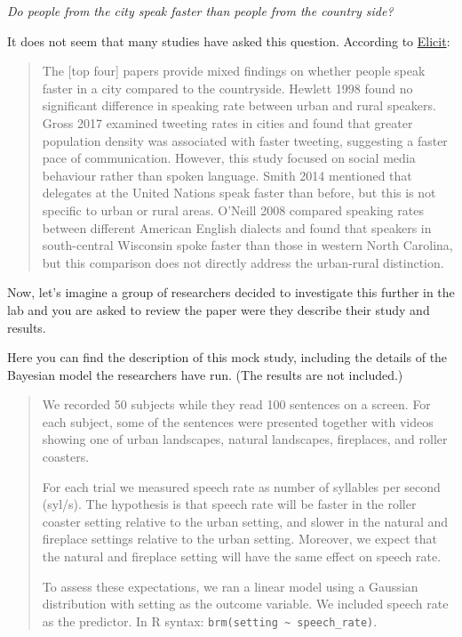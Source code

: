 \documentclass[
]{article}
\begin{document}
\emph{Do people from the city speak faster than people from the country
side?}

It does not seem that many studies have asked this question. According
to \href{elicit.com}{Elicit}:

\begin{quote}
The {[}top four{]} papers provide mixed findings on whether people speak
faster in a city compared to the countryside. Hewlett 1998 found no
significant difference in speaking rate between urban and rural
speakers. Gross 2017 examined tweeting rates in cities and found that
greater population density was associated with faster tweeting,
suggesting a faster pace of communication. However, this study focused
on social media behaviour rather than spoken language. Smith 2014
mentioned that delegates at the United Nations speak faster than before,
but this is not specific to urban or rural areas. O'Neill 2008 compared
speaking rates between different American English dialects and found
that speakers in south-central Wisconsin spoke faster than those in
western North Carolina, but this comparison does not directly address
the urban-rural distinction.
\end{quote}

Now, let's imagine a group of researchers decided to investigate this
further in the lab and you are asked to review the paper were they
describe their study and results.

Here you can find the description of this mock study, including the
details of the Bayesian model the researchers have run. (The results are
not included.)

\begin{quote}
We recorded 50 subjects while they read 100 sentences on a screen. For
each subject, some of the sentences were presented together with videos
showing one of urban landscapes, natural landscapes, fireplaces, and
roller coasters.

For each trial we measured speech rate as number of syllables per second
(syl/s). The hypothesis is that speech rate will be faster in the roller
coaster setting relative to the urban setting, and slower in the natural
and fireplace settings relative to the urban setting. Moreover, we
expect that the natural and fireplace setting will have the same effect
on speech rate.

To assess these expectations, we ran a linear model using a Gaussian
distribution with setting as the outcome variable. We included speech
rate as the predictor. In R syntax:
\texttt{brm(setting\ \textasciitilde{}\ speech\_rate)}.
\end{quote}
\end{document}

